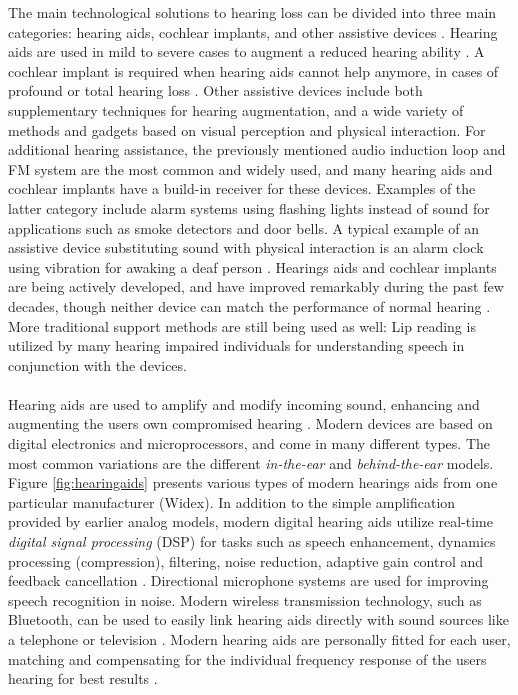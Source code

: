 \documentclass[english, 12pt, a4paper, pdftex, elec, utf8]{aaltothesis}
\begin{document}
The main technological solutions to hearing loss can be divided into three main categories: hearing aids, cochlear implants, and other assistive devices \cite{moore2007cochlear}. Hearing aids are used in mild to severe cases to augment a reduced hearing ability \cite{moore2007cochlear, levitt2007historical}. A cochlear implant is required when hearing aids cannot help anymore, in cases of profound or total hearing loss \cite{moore2007cochlear, levitt2007historical}. Other assistive devices include both supplementary techniques for hearing augmentation, and a wide variety of methods and gadgets based on visual perception and physical interaction. For additional hearing assistance, the previously mentioned audio induction loop and FM system are the most common and widely used, and many hearing aids and cochlear implants have a build-in receiver for these devices. Examples of the latter category include alarm systems using flashing lights instead of sound for applications such as smoke detectors and door bells. A typical example of an assistive device substituting sound with physical interaction is an alarm clock using vibration for awaking a deaf person \cite{mielke2013assistive}. Hearings aids and cochlear implants are being actively developed, and have improved remarkably during the past few decades, though neither device can match the performance of normal hearing \cite{moore2007cochlear, levitt2007historical, goehring2016speech}. More traditional support methods are still being used as well: Lip reading is utilized by many hearing impaired individuals for understanding speech in conjunction with the devices. \\\\
Hearing aids are used to amplify and modify incoming sound, enhancing and augmenting the users own compromised hearing \cite{levitt2007historical, salonen2013hearing, fink2008benefit}. Modern devices are based on digital electronics and microprocessors, and come in many different types. The most common variations are the different \textit{in-the-ear} and \textit{behind-the-ear} models. Figure \ref{fig:hearingaids} presents various types of modern hearings aids from one particular manufacturer (Widex). In addition to the simple amplification provided by earlier analog models, modern digital hearing aids utilize real-time \textit{digital signal processing} (DSP) for tasks such as speech enhancement, dynamics processing (compression), filtering, noise reduction, adaptive gain control and feedback cancellation \cite{moore2007cochlear, levitt2007historical, goehring2016speech}. Directional microphone systems are used for improving speech recognition in noise. Modern wireless transmission technology, such as Bluetooth, can be used to easily link hearing aids directly with sound sources like a telephone or television \cite{salonen2013hearing}. Modern hearing aids are personally fitted for each user, matching and compensating for the individual frequency response of the users hearing for best results \cite{moore2007cochlear}. \\
\end{document}

